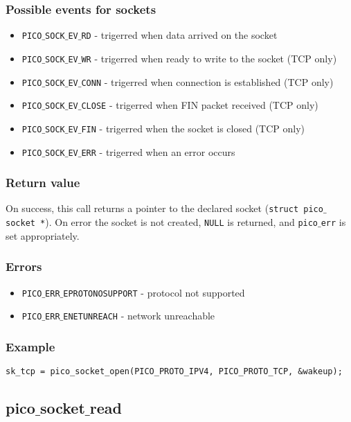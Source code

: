\subsubsection*{Possible events for sockets}
\begin{itemize}[noitemsep]
\item \texttt{PICO$\_$SOCK$\_$EV$\_$RD} - trigerred when data arrived on the socket
\item \texttt{PICO$\_$SOCK$\_$EV$\_$WR} - trigerred when ready to write to the socket (TCP only)
\item \texttt{PICO$\_$SOCK$\_$EV$\_$CONN} - trigerred when connection is established (TCP only)
\item \texttt{PICO$\_$SOCK$\_$EV$\_$CLOSE} - trigerred when FIN packet received (TCP only)
\item \texttt{PICO$\_$SOCK$\_$EV$\_$FIN} - trigerred when the socket is closed (TCP only)
\item \texttt{PICO$\_$SOCK$\_$EV$\_$ERR} - trigerred when an error occurs
\end{itemize}

\subsubsection*{Return value}
On success, this call returns a pointer to the declared socket (\texttt{struct pico$\_$socket *}).
On error the socket is not created, \texttt{NULL} is returned, and \texttt{pico$\_$err} is set appropriately.

\subsubsection*{Errors}
\begin{itemize}[noitemsep]
\item \texttt{PICO$\_$ERR$\_$EPROTONOSUPPORT} - protocol not supported
\item \texttt{PICO$\_$ERR$\_$ENETUNREACH} - network unreachable 
\end{itemize}

\subsubsection*{Example}
\begin{verbatim}
sk_tcp = pico_socket_open(PICO_PROTO_IPV4, PICO_PROTO_TCP, &wakeup);
\end{verbatim}


\subsection{pico$\_$socket$\_$read}

